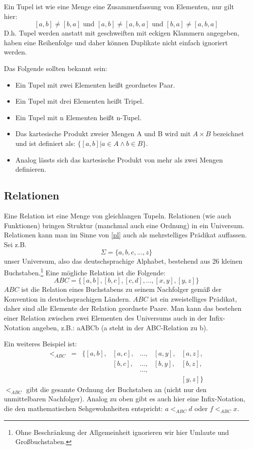 Ein Tupel ist wie eine Menge eine Zusammenfassung von Elementen, nur gilt hier:
\[[a,b] \neq [b,a] \text{ und } [a,b] \neq [a,b,a] \text{ und } [b,a] \neq [a,b,a]\]
D.h. Tupel werden anstatt mit geschweiften mit eckigen Klammern angegeben,
haben eine Reihenfolge und daher können Duplikate nicht einfach ignoriert werden.

\noindent
Das Folgende sollten bekannt sein:
\begin{itemize}
    \item Ein Tupel mit zwei Elementen heißt geordnetes Paar.
    \item Ein Tupel mit drei Elementen heißt Tripel.
    \item Ein Tupel mit n    Elementen heißt n-Tupel.
    \item Das kartesische Produkt zweier Mengen A und B wird mit $A \times B$ bezeichnet
          und ist definiert als: $\{[a,b]|a \in A \wedge b \in B\}$.
    \item Analog lässts sich das kartesische Produkt von mehr als zwei Mengen definieren.
\end{itemize}

\subsection{Relationen}

Eine Relation ist eine Menge von gleichlangen Tupeln.
Relationen (wie auch Funktionen) bringen Struktur (manchmal auch eine Ordnung)
in ein Universum.
Relationen kann man im Sinne von \autoref{pl} auch als mehrstelliges Prädikat auffassen.
Sei z.B.
\[
    \Sigma = \{a,b,c,...,z\}
\]
unser Universum, also das deutschsprachige Alphabet,
bestehend aus 26 kleinen Buchstaben.\footnote{
Ohne Beschränkung der Allgemeinheit ignorieren wir hier Umlaute und Großbuchstaben.}
Eine mögliche Relation ist die Folgende:
\[
    ABC = \{[a,b], [b,c], [c,d], \ldots, [x,y], [y,z]\}
\]
$ABC$ ist die Relation eines Buchstabens zu seinem Nachfolger
gemäß der Konvention in deutschsprachigen Ländern.
$ABC$ ist ein zweistelliges Prädikat, daher sind alle Elemente der Relation geordnete Paare.
Man kann das bestehen einer Relation zwischen zwei Elementen des Universums
auch in der Infix-Notation angeben, z.B.: aABCb (a steht in der ABC-Relation zu b).

Ein weiteres Beispiel ist:
\[
    \begin{array}{lllllll}
        <_{ABC} &
        = &
            \{[a,b], &
            [a,c], &
            \ldots, &
            [a,y], &
            [a,z],\\
        &
        &
        &
            [b,c], &
            \ldots, &
            [b,y], &
            [b,z], \\
        &
        &
        &
        &
            \ldots,\\
        &
        &
        &
        &
        &
        &
            [y,z] \}
\end{array}
\]
$<_{ABC}$ gibt die gesamte Ordnung der Buchstaben an (nicht nur den unmittelbaren Nachfolger).
Analog zu oben gibt es auch hier eine Infix-Notation,
die den mathematischen Sehgewohnheiten entspricht: $a <_{ABC} d$ oder $f <_{ABC} x$.

